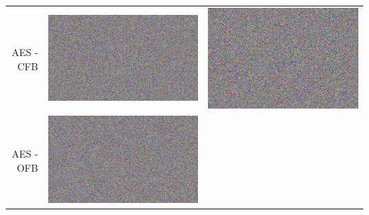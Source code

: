 \documentclass[fleqn, journal, onecolumn]{IEEEtran}             %
\theoremstyle{break}                                            %
\begin{document}
\begin{tabular}{|r || p{5cm} | p{5cm} | }
\begin{minipage}{.2\textwidth}
        \end{minipage}    
        \\\hline
        AES - CFB  &  
        \begin{minipage}{.2\textwidth}
          \includegraphics[width=\linewidth]{1AES3}
        \end{minipage}  & 
        \begin{minipage}{.2\textwidth}
          \includegraphics[width=\linewidth]{2AES3}
        \end{minipage}    
        \\\hline
        AES - OFB  &  
        \begin{minipage}{.2\textwidth}
          \includegraphics[width=\linewidth]{1AES4}

\end{minipage}
\end{tabular}
\end{document}
